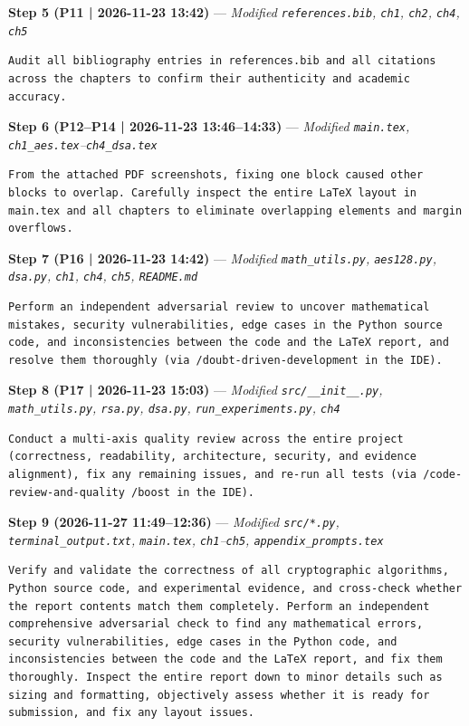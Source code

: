 \textbf{Step 5 (P11 | 2026-11-23 13:42)} --- \textit{Modified \texttt{references.bib}, \texttt{ch1}, \texttt{ch2}, \texttt{ch4}, \texttt{ch5}}
\begin{lstlisting}[style=promptstyle]
Audit all bibliography entries in references.bib and all citations across the chapters to confirm their authenticity and academic accuracy.
\end{lstlisting}

\textbf{Step 6 (P12--P14 | 2026-11-23 13:46--14:33)} --- \textit{Modified \texttt{main.tex}, \texttt{ch1\_aes.tex}--\texttt{ch4\_dsa.tex}}
\begin{lstlisting}[style=promptstyle]
From the attached PDF screenshots, fixing one block caused other blocks to overlap. Carefully inspect the entire LaTeX layout in main.tex and all chapters to eliminate overlapping elements and margin overflows.
\end{lstlisting}

\textbf{Step 7 (P16 | 2026-11-23 14:42)} --- \textit{Modified \texttt{math\_utils.py}, \texttt{aes128.py}, \texttt{dsa.py}, \texttt{ch1}, \texttt{ch4}, \texttt{ch5}, \texttt{README.md}}
\begin{lstlisting}[style=promptstyle]
Perform an independent adversarial review to uncover mathematical mistakes, security vulnerabilities, edge cases in the Python source code, and inconsistencies between the code and the LaTeX report, and resolve them thoroughly (via /doubt-driven-development in the IDE).
\end{lstlisting}

\textbf{Step 8 (P17 | 2026-11-23 15:03)} --- \textit{Modified \texttt{src/\_\_init\_\_.py}, \texttt{math\_utils.py}, \texttt{rsa.py}, \texttt{dsa.py}, \texttt{run\_experiments.py}, \texttt{ch4}}
\begin{lstlisting}[style=promptstyle]
Conduct a multi-axis quality review across the entire project (correctness, readability, architecture, security, and evidence alignment), fix any remaining issues, and re-run all tests (via /code-review-and-quality /boost in the IDE).
\end{lstlisting}

\textbf{Step 9 (2026-11-27 11:49--12:36)} --- \textit{Modified \texttt{src/*.py}, \texttt{terminal\_output.txt}, \texttt{main.tex}, \texttt{ch1}--\texttt{ch5}, \texttt{appendix\_prompts.tex}}
\begin{lstlisting}[style=promptstyle]
Verify and validate the correctness of all cryptographic algorithms, Python source code, and experimental evidence, and cross-check whether the report contents match them completely. Perform an independent comprehensive adversarial check to find any mathematical errors, security vulnerabilities, edge cases in the Python code, and inconsistencies between the code and the LaTeX report, and fix them thoroughly. Inspect the entire report down to minor details such as sizing and formatting, objectively assess whether it is ready for submission, and fix any layout issues.
\end{lstlisting}

